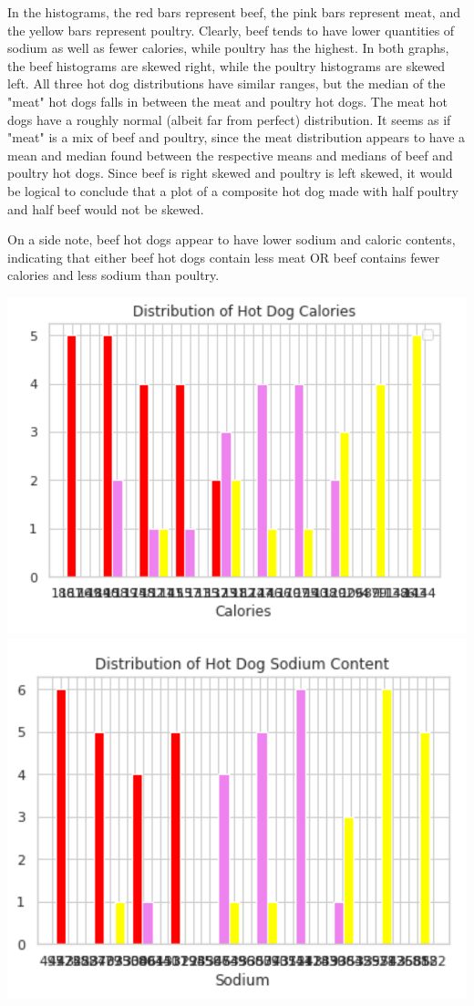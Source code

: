 \documentclass{article}
\begin{document}
 In the histograms, the red bars represent beef, the pink bars represent meat, and the yellow bars represent poultry. Clearly, beef tends to have lower quantities of sodium as well as fewer calories, while poultry has the highest. In both graphs, the beef histograms are skewed right, while the poultry histograms are skewed left. All three hot dog distributions have similar ranges, but the median of the "meat" hot dogs falls in between the meat and poultry hot dogs. The meat hot dogs have a roughly normal (albeit far from perfect) distribution. It seems as if "meat" is a mix of beef and poultry, since the meat distribution appears to have a mean and median found between the respective means and medians of beef and poultry hot dogs. Since beef is right skewed and poultry is left skewed, it would be logical to conclude that a plot of a composite hot dog made with half poultry and half beef would not be skewed. 
 
 On a side note, beef hot dogs appear to have lower sodium and caloric contents, indicating that either beef hot dogs contain less meat OR beef contains fewer calories and less sodium than poultry. \newline
 
 \includegraphics{HW1_3.PNG}
 \newline
 \includegraphics{HW1_4.PNG}
 \newline
 
\end{document}
